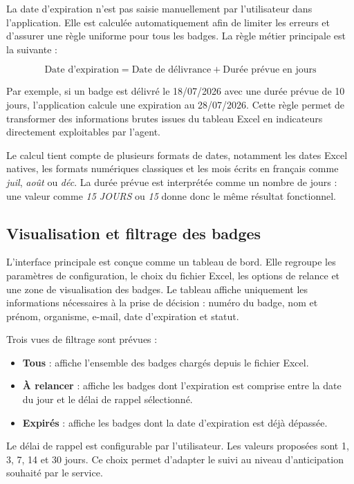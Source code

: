 \documentclass[12pt,a4paper,openany]{report}
\begin{document}
La date d'expiration n'est pas saisie manuellement par l'utilisateur dans
l'application. Elle est calculée automatiquement afin de limiter les erreurs et
d'assurer une règle uniforme pour tous les badges. La règle métier principale
est la suivante :

\[
\text{Date d'expiration} = \text{Date de délivrance} + \text{Durée prévue en jours}
\]

Par exemple, si un badge est délivré le 18/07/2026 avec une durée prévue de 10
jours, l'application calcule une expiration au 28/07/2026. Cette règle permet de
transformer des informations brutes issues du tableau Excel en indicateurs
directement exploitables par l'agent.

Le calcul tient compte de plusieurs formats de dates, notamment les dates Excel
natives, les formats numériques classiques et les mois écrits en français comme
\textit{juil}, \textit{août} ou \textit{déc}. La durée prévue est interprétée
comme un nombre de jours : une valeur comme \textit{15 JOURS} ou \textit{15}
donne donc le même résultat fonctionnel.

\subsection{Visualisation et filtrage des badges}

L'interface principale est conçue comme un tableau de bord. Elle regroupe les
paramètres de configuration, le choix du fichier Excel, les options de relance
et une zone de visualisation des badges. Le tableau affiche uniquement les
informations nécessaires à la prise de décision : numéro du badge, nom et
prénom, organisme, e-mail, date d'expiration et statut.

Trois vues de filtrage sont prévues :

\begin{itemize}
  \item \textbf{Tous} : affiche l'ensemble des badges chargés depuis le fichier
  Excel.
  \item \textbf{À relancer} : affiche les badges dont l'expiration est comprise
  entre la date du jour et le délai de rappel sélectionné.
  \item \textbf{Expirés} : affiche les badges dont la date d'expiration est déjà
  dépassée.
\end{itemize}

Le délai de rappel est configurable par l'utilisateur. Les valeurs proposées
sont 1, 3, 7, 14 et 30 jours. Ce choix permet d'adapter le suivi au niveau
d'anticipation souhaité par le service.
\end{document}
